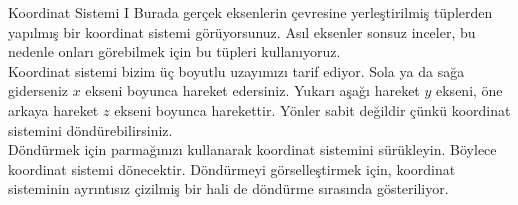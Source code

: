 \begin{surferPage}[Koordinatlar I]{Koordinat Sistemi I}
Burada gerçek eksenlerin çevresine yerleştirilmiş tüplerden yapılmış bir koordinat sistemi görüyorsunuz. Asıl eksenler sonsuz inceler, bu nedenle onları görebilmek için bu tüpleri kullanıyoruz. \\
Koordinat sistemi bizim üç boyutlu uzayımızı tarif ediyor. Sola ya da sağa giderseniz  $x$ ekseni boyunca hareket edersiniz. Yukarı aşağı hareket $y$ ekseni, öne arkaya hareket  $z$ ekseni boyunca harekettir. Yönler sabit değildir çünkü koordinat sistemini döndürebilirsiniz.\\
\vspace{0.3cm}
Döndürmek için parmağınızı kullanarak  koordinat sistemini sürükleyin. Böylece koordinat sistemi dönecektir. Döndürmeyi görselleştirmek için, koordinat sisteminin ayrıntısız çizilmiş bir hali de döndürme sırasında gösteriliyor.
\end{surferPage}
